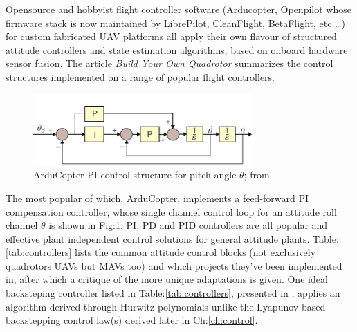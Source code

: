 Opensource and hobbyist flight controller software (Arducopter\cite{arducoptersite}, Openpilot\cite{openpilotsite} whose firmware stack is now maintained by LibrePilot, CleanFlight\cite{cleanflight}, BetaFlight\cite{betaflight}, etc \ldots) for custom fabricated UAV platforms all apply their own flavour of structured attitude controllers and state estimation algorithms, based on onboard hardware sensor fusion. The article \emph{Build Your Own Quadrotor}\cite{buildyourownquad} summarizes the control structures implemented on a range of popular flight controllers. 
\par
\begin{figure}[hbtp]
\centering
\includegraphics[width=0.75\textwidth]{figs/arducopter-pi}
\caption{ArduCopter PI control structure for pitch angle $\theta$; from~\cite{buildyourownquad}}
\label{fig:arducopter-pi}
\vspace{-10pt}
\end{figure}
The most popular of which, ArduCopter, implements a feed-forward PI compensation controller, whose single channel control loop for an attitude roll channel $\theta$ is shown in Fig:\ref{fig:arducopter-pi}.  PI, PD and PID controllers are all popular and effective plant independent control solutions for general attitude plants. Table:\ref{tab:controllers} lists the common attitude control blocks (not exclusively quadrotors UAVs but MAVs too) and which projects they've been implemented in, after which a critique of the more unique adaptations is given. One ideal backsteping controller listed in Table:\ref{tab:controllers}, presented in \cite{tpheonix}, applies an algorithm derived through Hurwitz polynomials unlike the Lyapunov based backstepping control law(s) derived later in Ch:\ref{ch:control}.
